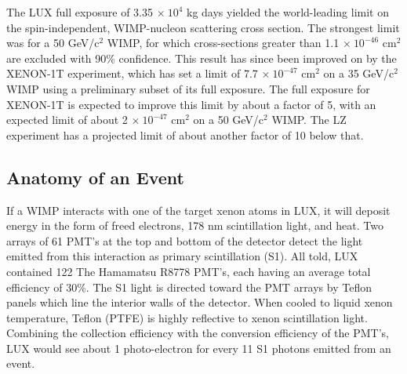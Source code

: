 The LUX full exposure of 3.35 $\times \ 10^4$ kg days yielded the world-leading limit on the spin-independent, WIMP-nucleon scattering cross section. The strongest limit was for a 50 GeV/c$^2$ WIMP, for which cross-sections greater than 1.1 $\times \ 10^{-46}$ cm$^2$ are excluded with 90\% confidence. This result has since been improved on by the XENON-1T experiment, which has set a limit of 7.7 $\times \ 10^{-47}$ cm$^2$ on a 35 GeV/c$^2$ WIMP using a preliminary subset of its full exposure. The full exposure for XENON-1T is expected to improve this limit by about a factor of 5, with an expected limit of about 2 $\times \ 10^{-47}$ cm$^2$ on a 50 GeV/c$^2$ WIMP. The LZ experiment has a projected limit of about another factor of 10 below that.


\subsection{Anatomy of an Event}
If a WIMP interacts with one of the target xenon atoms in LUX, it will deposit energy in the form of freed electrons, 178 nm scintillation light, and heat. Two arrays of 61 PMT's at the top and bottom of the detector detect the light emitted from this interaction as primary scintillation (S1). All told, LUX contained 122 The Hamamatsu R8778 PMT's, each having an average total efficiency of 30\%. The S1 light is directed toward the PMT arrays by Teflon panels which line the interior walls of the detector. When cooled to liquid xenon temperature, Teflon (PTFE) is highly reflective to xenon scintillation light\cite{ptfe_ref}. Combining the collection efficiency with the conversion efficiency of the PMT's, LUX would see about 1 photo-electron for every 11 S1 photons emitted from an event.
